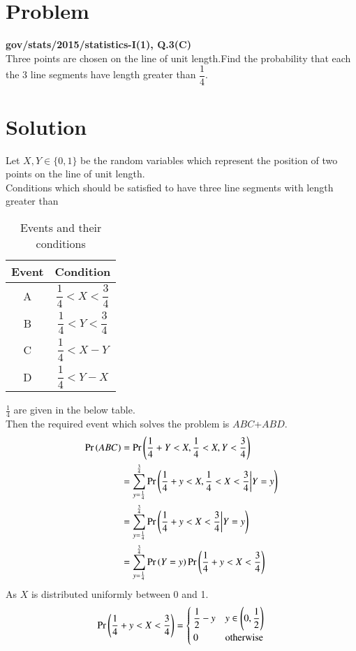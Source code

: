 \documentclass[journal,12pt,twocolumn]{IEEEtran}
\begin{document}
\section{Problem}
\textbf{gov/stats/2015/statistics-I(1), Q.3(C)}\\
  Three points are chosen on the line of unit length.Find the probability that each the 3 line segments have length greater than $\dfrac{1}{4}$.
\section{Solution}
 Let $X,Y \in \{0,1\}$ be the random variables which represent the position of two points on the line of unit length.\\
Conditions which should be satisfied to have three line segments with length greater than 
\begin{table}[h]
\centering
\bgroup
\def\arraystretch{2}
\begin{tabular}{|c|c|}
\hline
\textbf{Event} & \textbf{Condition}                     \\\hline
A              & $\dfrac{1}{4}<X<\dfrac{3}{4}$ \\[1ex] \hline
B              & $\dfrac{1}{4}<Y<\dfrac{3}{4}$ \\[1ex] \hline
C              & $\dfrac{1}{4}<X-Y$ \\[1ex] \hline
D           & $\dfrac{1}{4}<Y-X$ \\[1ex] \hline
\end{tabular}
\egroup
\caption{Events and their conditions}
\label{tab:Events}
\end{table}
$\frac{1}{4}$ are given in the below table.\\
Then the required event which solves the problem is $ABC$+$ABD$.\\
\begin{align}
    \Pr\left(ABC\right)&=\Pr\left(\frac{1}{4}+Y<X,\frac{1}{4}<X,Y<\frac{3}{4}\right)\\
    &=\sum_{y=\frac{1}{4}}^{\frac{3}{4}}\Pr\left(\frac{1}{4}+y<X,\frac{1}{4}<X<\frac{3}{4}\biggr\rvert Y=y\right)\\
     &=\sum_{y=\frac{1}{4}}^{\frac{3}{4}}\Pr\left(\frac{1}{4}+y<X<\frac{3}{4}\biggr\rvert Y=y\right)\\
     &=\sum_{y=\frac{1}{4}}^{\frac{3}{4}}\Pr\left(Y=y\right)\Pr\left(\frac{1}{4}+y<X<\frac{3}{4}\right)\label{step2}
     \end{align}
     As $X$ is distributed uniformly between 0 and 1.
     \begin{align}
        \Pr\left(\frac{1}{4}+y<X<\frac{3}{4}\right)=\begin{cases}
        \dfrac{1}{2}-y&y\in \left(0,\dfrac{1}{2}\right)\\
        0&\text{otherwise}
        \end{cases}\label{step2help}
     \end{align}
\end{document}
